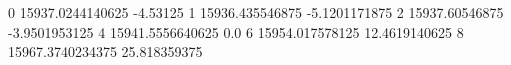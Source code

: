 0 15937.0244140625 -4.53125
1 15936.435546875 -5.1201171875
2 15937.60546875 -3.9501953125
4 15941.5556640625 0.0
6 15954.017578125 12.4619140625
8 15967.3740234375 25.818359375
